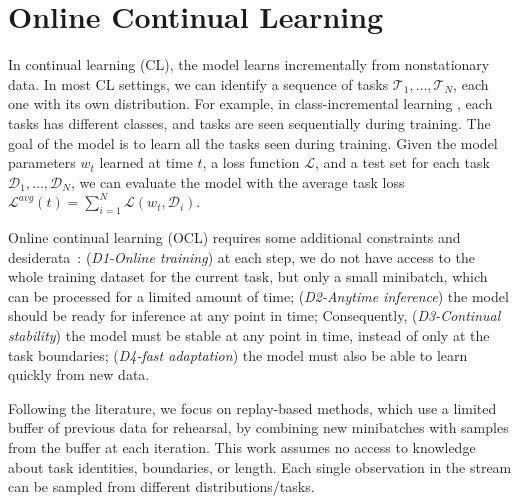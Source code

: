\section{Online Continual Learning}
In continual learning (CL), the model learns incrementally from nonstationary data. 
In most CL settings, we can identify a sequence of tasks $\mathcal{T}_1, \hdots, \mathcal{T}_N$, each one with its own distribution. For example, in class-incremental learning \cite{DBLP:journals/corr/abs-1904-07734}, each tasks has different classes, and tasks are seen sequentially during training. The goal of the model is to learn all the tasks seen during training. Given the model parameters $w_t$ learned at time $t$, a loss function $\mathcal{L}$, and a test set for each task $\mathcal{D}_1, \hdots, \mathcal{D}_N$, we can evaluate the model with the average task loss $\mathcal{L}^{avg}(t) = \sum_{i=1}^N \mathcal{L}(w_t, \mathcal{D}_i)$.

Online continual learning (OCL) requires some additional constraints and desiderata~\cite{DBLP:conf/iccvw/Soutif-Cormerais23,yoo2024layerwise,DBLP:journals/ijon/MaiLJQKS22}: (\emph{D1-Online training}) at each step, we do not have access to the whole training dataset for the current task, but only a small minibatch, which can be processed for a limited amount of time; (\emph{D2-Anytime inference}) the model should be ready for inference at any point in time; Consequently, (\emph{D3-Continual stability}) the model must be stable at any point in time, instead of only at the task boundaries; (\emph{D4-fast adaptation}) the model must also be able to learn quickly from new data.


Following the literature, we focus on replay-based methods, which use a limited buffer of previous data for rehearsal, by combining new minibatches with samples from the buffer at each iteration. This work assumes no access to knowledge about task identities, boundaries, or length. Each single observation in the stream can be sampled from different distributions/tasks.

